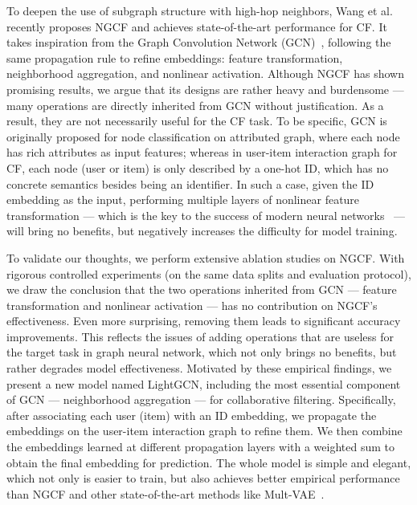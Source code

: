 To deepen the use of subgraph structure with high-hop neighbors, Wang et al.~\cite{NGCF} recently proposes NGCF and achieves state-of-the-art performance for CF. It takes inspiration from the Graph Convolution Network (GCN)~\cite{GCN,GraphSAGE}, following the same propagation rule to refine embeddings: feature transformation, neighborhood aggregation, and nonlinear activation. Although NGCF has shown promising results, we argue that its designs are rather heavy and burdensome --- many operations are directly inherited from GCN without justification. As a result, they are not necessarily useful for the CF task. To be specific, GCN is originally proposed for node classification on attributed graph, where each node has rich attributes as input features; whereas in user-item interaction graph for CF, each node (user or item) is only described by a one-hot ID, which has no concrete semantics besides being an identifier. In such a case, given the ID embedding as the input, performing multiple layers of nonlinear feature transformation --- which is the key to the success of modern neural networks~\cite{ResNet} --- will bring no benefits, but negatively increases the difficulty for model training. 

To validate our thoughts, we perform extensive ablation studies on NGCF. With rigorous controlled experiments (on the same data splits and evaluation protocol), we draw the conclusion that the two operations inherited from GCN --- feature transformation and nonlinear activation --- has no contribution on NGCF's effectiveness. Even more surprising, removing them leads to significant accuracy improvements. This reflects the issues of adding operations that are useless for the target task in graph neural network, which not only brings no benefits, but rather degrades model effectiveness. Motivated by these empirical findings, we present a new model named LightGCN, including the most essential component of GCN --- neighborhood aggregation --- for collaborative filtering. Specifically, after associating each user (item) with an ID embedding, we propagate the embeddings on the user-item interaction graph to refine them. We then combine the embeddings learned at different propagation layers with a weighted sum to obtain the final embedding for prediction. The whole model is simple and elegant, which not only is easier to train, but also achieves better empirical performance than NGCF and other state-of-the-art methods like Mult-VAE~\cite{VACF}. 

